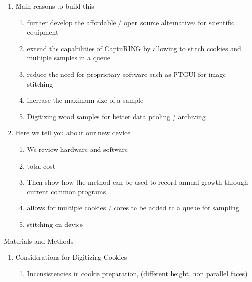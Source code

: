 \documentclass{article}
\begin{document}
\begin{outline}[enumerate]
\begin{enumerate}
	\item Main reasons to build this 
		\begin{enumerate} 
		\item further develop the affordable / open source alternatives for scientific equipment
		\item extend the capabilities of CaptuRING by allowing to stitch cookies and multiple samples in a queue
		\item reduce the need for proprietary software such as PTGUI for image stitching
		\item increase the maximum size of a sample 
		\item Digitizing wood samples for better data pooling / archiving
		\end{enumerate} 
	\item Here we tell you about our new device
		\begin{enumerate}
		\item We review hardware and software 
		\item total cost
		\item Then show how the method can be used to record annual growth through current common programs 
		\item allows for multiple cookies / cores to be added to a queue for sampling
		\item stitching on device 
		\end{enumerate}
	\end{enumerate}
\item Materials and Methods
		\begin{enumerate}
		\item Considerations for Digitizing Cookies
			\begin{enumerate}
			\item Inconsistencies in cookie preparation, (different height, non parallel faces)%

\end{enumerate}
\end{enumerate}
\end{outline}
\end{document}
